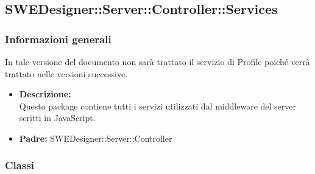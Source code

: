   \subsection{SWEDesigner::Server::Controller::Services}
    \subsubsection{Informazioni generali}
      In tale versione del documento non sarà trattato il servizio di Profile poiché verrà trattato nelle versioni successive.
      \begin{itemize}
        \item \textbf{Descrizione: }\\
        Questo package contiene tutti i servizi utilizzati dal middleware del server scritti in JavaScript.
        \item \textbf{Padre: }SWEDesigner::Server::Controller
      \end{itemize}
    \subsubsection{Classi}
